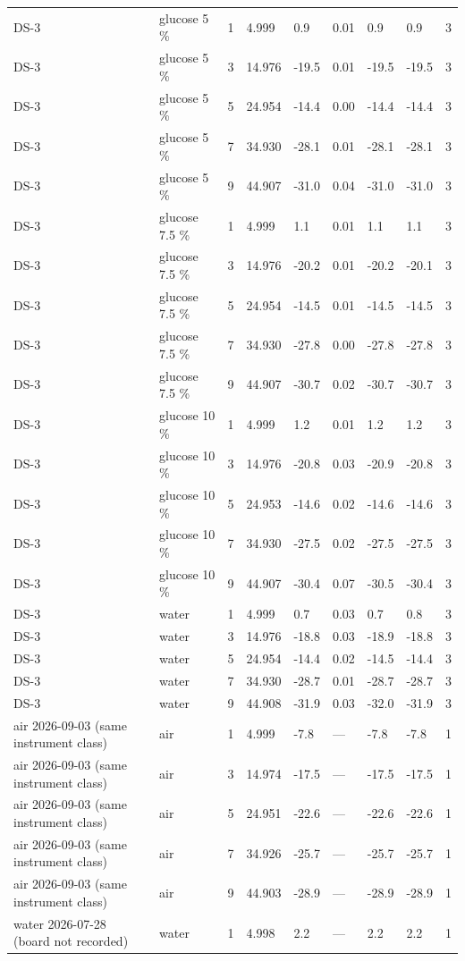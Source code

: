 \documentclass[11pt,a4paper]{article}
\begin{document}
\begin{landscape}
{\begin{longtable}{@{}lllllllll@{}}
DS-3 & glucose 5 \% & 1 & 4.999 & 0.9 & 0.01 & 0.9 & 0.9 & 3 \\
DS-3 & glucose 5 \% & 3 & 14.976 & -19.5 & 0.01 & -19.5 & -19.5 & 3 \\
DS-3 & glucose 5 \% & 5 & 24.954 & -14.4 & 0.00 & -14.4 & -14.4 & 3 \\
DS-3 & glucose 5 \% & 7 & 34.930 & -28.1 & 0.01 & -28.1 & -28.1 & 3 \\
DS-3 & glucose 5 \% & 9 & 44.907 & -31.0 & 0.04 & -31.0 & -31.0 & 3 \\
DS-3 & glucose 7.5 \% & 1 & 4.999 & 1.1 & 0.01 & 1.1 & 1.1 & 3 \\
DS-3 & glucose 7.5 \% & 3 & 14.976 & -20.2 & 0.01 & -20.2 & -20.1 & 3 \\
DS-3 & glucose 7.5 \% & 5 & 24.954 & -14.5 & 0.01 & -14.5 & -14.5 & 3 \\
DS-3 & glucose 7.5 \% & 7 & 34.930 & -27.8 & 0.00 & -27.8 & -27.8 & 3 \\
DS-3 & glucose 7.5 \% & 9 & 44.907 & -30.7 & 0.02 & -30.7 & -30.7 & 3 \\
DS-3 & glucose 10 \% & 1 & 4.999 & 1.2 & 0.01 & 1.2 & 1.2 & 3 \\
DS-3 & glucose 10 \% & 3 & 14.976 & -20.8 & 0.03 & -20.9 & -20.8 & 3 \\
DS-3 & glucose 10 \% & 5 & 24.953 & -14.6 & 0.02 & -14.6 & -14.6 & 3 \\
DS-3 & glucose 10 \% & 7 & 34.930 & -27.5 & 0.02 & -27.5 & -27.5 & 3 \\
DS-3 & glucose 10 \% & 9 & 44.907 & -30.4 & 0.07 & -30.5 & -30.4 & 3 \\
DS-3 & water & 1 & 4.999 & 0.7 & 0.03 & 0.7 & 0.8 & 3 \\
DS-3 & water & 3 & 14.976 & -18.8 & 0.03 & -18.9 & -18.8 & 3 \\
DS-3 & water & 5 & 24.954 & -14.4 & 0.02 & -14.5 & -14.4 & 3 \\
DS-3 & water & 7 & 34.930 & -28.7 & 0.01 & -28.7 & -28.7 & 3 \\
DS-3 & water & 9 & 44.908 & -31.9 & 0.03 & -32.0 & -31.9 & 3 \\
air 2026-09-03 (same instrument class) & air & 1 & 4.999 & -7.8 & --- & -7.8 & -7.8 & 1 \\
air 2026-09-03 (same instrument class) & air & 3 & 14.974 & -17.5 & --- & -17.5 & -17.5 & 1 \\
air 2026-09-03 (same instrument class) & air & 5 & 24.951 & -22.6 & --- & -22.6 & -22.6 & 1 \\
air 2026-09-03 (same instrument class) & air & 7 & 34.926 & -25.7 & --- & -25.7 & -25.7 & 1 \\
air 2026-09-03 (same instrument class) & air & 9 & 44.903 & -28.9 & --- & -28.9 & -28.9 & 1 \\
water 2026-07-28 (board not recorded) & water & 1 & 4.998 & 2.2 & --- & 2.2 & 2.2 & 1 \\
\bottomrule
\end{longtable}}\end{landscape}
\end{document}
